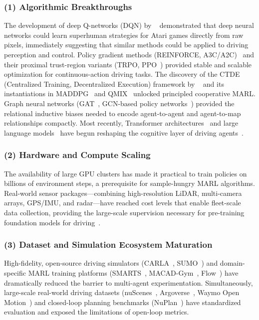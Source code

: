 \documentclass[12pt, a4paper]{article}
\begin{document}
\subsubsection*{(1) Algorithmic Breakthroughs}
The development of deep Q-networks (DQN) by \citeauthor{mnih2015human}~\cite{mnih2015human}
demonstrated that deep neural networks could learn superhuman strategies for
Atari games directly from raw pixels, immediately suggesting that similar
methods could be applied to driving perception and control.  Policy gradient
methods (REINFORCE, A3C/A2C)~\cite{mnih2016asynchronous} and their proximal
trust-region variants (TRPO, PPO~\cite{schulman2017proximal}) provided stable
and scalable optimization for continuous-action driving tasks.  The discovery
of the CTDE (Centralized Training, Decentralized Execution) framework by
\citeauthor{kraemer2016multi}~\cite{kraemer2016multi} and its instantiations
in MADDPG~\cite{lowe2017multi} and QMIX~\cite{rashid2018qmix} unlocked
principled cooperative MARL.  Graph neural networks
(GAT~\cite{velickovic2018graph}, GCN-based policy networks~\cite{jiang2019graph})
provided the relational inductive biases needed to encode agent-to-agent
and agent-to-map relationships compactly.  Most recently, Transformer
architectures~\cite{vaswani2017attention} and large language
models~\cite{brown2020language} have begun reshaping the cognitive layer of
driving agents~\cite{wen2022multi,fu2023drive,sha2023languagempc}.

\subsubsection*{(2) Hardware and Compute Scaling}
The availability of large GPU clusters has made it practical to train policies
on billions of environment steps, a prerequisite for sample-hungry MARL
algorithms.  Real-world sensor packages---combining high-resolution LiDAR,
multi-camera arrays, GPS/IMU, and radar---have reached cost levels that enable
fleet-scale data collection, providing the large-scale supervision necessary for
pre-training foundation models for driving~\cite{caesar2020nuscenes}.

\subsubsection*{(3) Dataset and Simulation Ecosystem Maturation}
High-fidelity, open-source driving simulators (CARLA~\cite{dosovitskiy2017carlaopenurbandriving},
SUMO~\cite{krajzewicz2012recent}) and domain-specific MARL training
platforms (SMARTS~\cite{zhou2020smarts}, MACAD-Gym~\cite{palanisamy2020multi},
Flow~\cite{wu2017flow}) have dramatically reduced the barrier to multi-agent
experimentation.  Simultaneously, large-scale real-world driving datasets
(nuScenes~\cite{caesar2020nuscenes}, Argoverse~\cite{chang2019argoverse},
Waymo Open Motion~\cite{ettinger2021large}) and closed-loop planning
benchmarks (NuPlan~\cite{caesar2021nuplan}) have standardized evaluation
and exposed the limitations of open-loop metrics.
\end{document}
